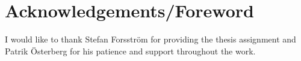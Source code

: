 \section*{Acknowledgements/Foreword}\label{sec:acknowledgements}
{}

I would like to thank Stefan Forsstr\"om for providing the thesis assignment and
Patrik \"Osterberg for his patience and support throughout the work.
